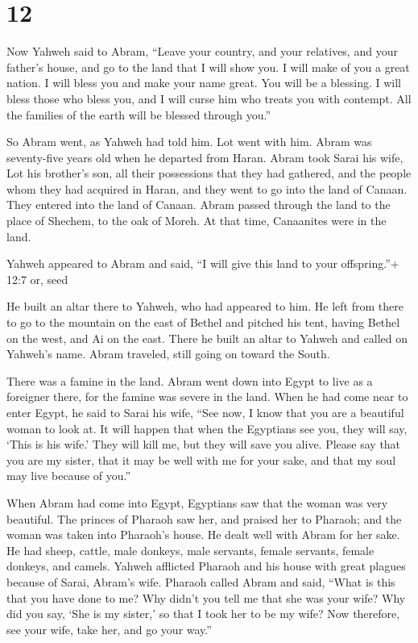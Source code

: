 \hypertarget{section-11}{%
\section{12}\label{section-11}}

 Now Yahweh said to Abram, ``Leave your country, and your
relatives, and your father's house, and go to the land that I will show
you.  I will make of you a great nation. I will bless you
and make your name great. You will be a blessing.  I will
bless those who bless you, and I will curse him who treats you with
contempt. All the families of the earth will be blessed through you.''

 So Abram went, as Yahweh had told him. Lot went with him.
Abram was seventy-five years old when he departed from Haran.
 Abram took Sarai his wife, Lot his brother's son, all their
possessions that they had gathered, and the people whom they had
acquired in Haran, and they went to go into the land of Canaan. They
entered into the land of Canaan.  Abram passed through the
land to the place of Shechem, to the oak of Moreh. At that time,
Canaanites were in the land.

 Yahweh appeared to Abram and said, ``I will give this land
to your offspring.''+ 12:7 or, seed

He built an altar there to Yahweh, who had appeared to him. 
He left from there to go to the mountain on the east of Bethel and
pitched his tent, having Bethel on the west, and Ai on the east. There
he built an altar to Yahweh and called on Yahweh's name. 
Abram traveled, still going on toward the South.

 There was a famine in the land. Abram went down into Egypt
to live as a foreigner there, for the famine was severe in the land.
 When he had come near to enter Egypt, he said to Sarai his
wife, ``See now, I know that you are a beautiful woman to look at.
 It will happen that when the Egyptians see you, they will
say, `This is his wife.' They will kill me, but they will save you
alive.  Please say that you are my sister, that it may be
well with me for your sake, and that my soul may live because of you.''

 When Abram had come into Egypt, Egyptians saw that the
woman was very beautiful.  The princes of Pharaoh saw her,
and praised her to Pharaoh; and the woman was taken into Pharaoh's
house.  He dealt well with Abram for her sake. He had
sheep, cattle, male donkeys, male servants, female servants, female
donkeys, and camels.  Yahweh afflicted Pharaoh and his
house with great plagues because of Sarai, Abram's wife. 
Pharaoh called Abram and said, ``What is this that you have done to me?
Why didn't you tell me that she was your wife?  Why did you
say, `She is my sister,' so that I took her to be my wife? Now
therefore, see your wife, take her, and go your way.''

